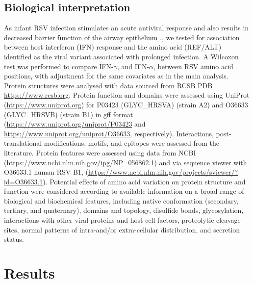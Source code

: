 \documentclass{article} %
\begin{document}
\subsection{Biological interpretation}
As infant RSV infection stimulates an acute antiviral response and also results in decreased barrier function of the airway epithelium \citep{connelly2021metabolic}., we tested for association between host interferon (IFN) response and the amino acid (REF/ALT) identified as the viral variant associated with prolonged infection. A Wilcoxon test was performed to compare  IFN-$\gamma$, and IFN-$\alpha$, between RSV amino acid positions, with adjustment for the same covariates as in the main analysis. Protein structures were analysed with data sourced from RCSB PDB \url{https://www.rcsb.org}. Protein function and domains were assessed using UniProt	(\url{https://www.uniprot.org}) for P03423 (GLYC\_HRSVA) (strain A2) and O36633 (GLYC\_HRSVB) (strain B1) in gff format (\url{https://www.uniprot.org/uniprot/P03423} and
\url{https://www.uniprot.org/uniprot/O36633}, respectively). 
Interactions, post-translational modifications, motifs, and epitopes were assessed from the literature. Protein features were assessed using data from NCBI (\url{https://www.ncbi.nlm.nih.gov/ipg/NP_056862.1}) and via sequence viewer with O36633.1 human RSV B1, 
(\url{https://www.ncbi.nlm.nih.gov/projects/sviewer/?id=O36633.1}). 
Potential effects of amino acid variation on protein structure and function were considered according to available information on a broad range of biological and biochemical features, including native conformation (secondary, tertiary, and quaternary), domains and topology, disulfide bonds, glycosylation, interactions with other viral proteins and host-cell factors, proteolytic cleavage sites, normal patterns of intra-and/or extra-cellular distribution, and secretion status.

\section{Results}
\end{document}
